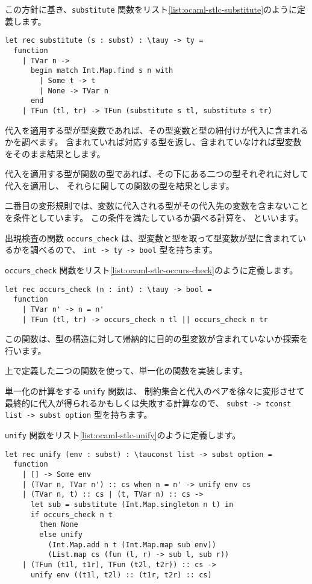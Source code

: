 この方針に基き、\texttt{substitute} 関数をリスト\ref{list:ocaml-stlc-substitute}のように定義します。

\begin{lstlisting}[caption=代入, label=list:ocaml-stlc-substitute]
let rec substitute (s : subst) : \tauy -> ty =
  function
    | TVar n ->
      begin match Int.Map.find s n with
        | Some t -> t
        | None -> TVar n
      end
    | TFun (tl, tr) -> TFun (substitute s tl, substitute s tr)
\end{lstlisting}

代入を適用する型が型変数であれば、その型変数と型の紐付けが代入に含まれるかを調べます。
含まれていれば対応する型を返し、含まれていなければ型変数をそのまま結果とします。

代入を適用する型が関数の型であれば、その下にある二つの型それぞれに対して代入を適用し、
それらに関しての関数の型を結果とします。

二番目の変形規則では、変数に代入される型がその代入先の変数を含まないことを条件としています。
この条件を満たしているか調べる計算を、 といいます。

出現検査の関数 \texttt{occurs\_check} は、型変数と型を取って型変数が型に含まれているかを調べるので、
\texttt{int -> ty -> bool} 型を持ちます。

\texttt{occurs\_check} 関数をリスト\ref{list:ocaml-stlc-occurs-check}のように定義します。

\begin{lstlisting}[caption=出現検査, label=list:ocaml-stlc-occurs-check]
let rec occurs_check (n : int) : \tauy -> bool =
  function
    | TVar n' -> n = n'
    | TFun (tl, tr) -> occurs_check n tl || occurs_check n tr
\end{lstlisting}

この関数は、型の構造に対して帰納的に目的の型変数が含まれていないか探索を行います。

上で定義した二つの関数を使って、単一化の関数を実装します。

単一化の計算をする \texttt{unify} 関数は、
制約集合と代入のペアを徐々に変形させて最終的に代入が得られるかもしくは失敗する計算なので、
\texttt{subst -> tconst list -> subst option} 型を持ちます。

\texttt{unify} 関数をリスト\ref{list:ocaml-stlc-unify}のように定義します。

\begin{lstlisting}[caption=単一化, label=list:ocaml-stlc-unify]
let rec unify (env : subst) : \tauconst list -> subst option =
  function
    | [] -> Some env
    | (TVar n, TVar n') :: cs when n = n' -> unify env cs
    | (TVar n, t) :: cs | (t, TVar n) :: cs ->
      let sub = substitute (Int.Map.singleton n t) in
      if occurs_check n t
        then None
        else unify
          (Int.Map.add n t (Int.Map.map sub env))
          (List.map cs (fun (l, r) -> sub l, sub r))
    | (TFun (t1l, t1r), TFun (t2l, t2r)) :: cs ->
      unify env ((t1l, t2l) :: (t1r, t2r) :: cs)
\end{lstlisting}

